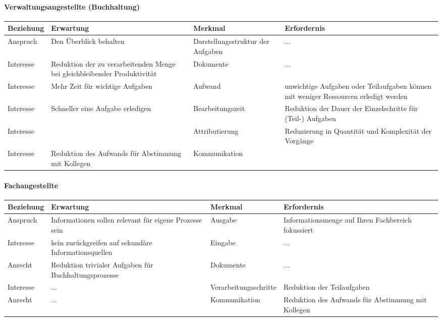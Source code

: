 \documentclass[11pt,oneside,a4paper,notitlepage]{article}
\begin{document}
\paragraph*{Verwaltungsangestellte (Buchhaltung) }
\begin{center}
\begin{tabular}{| p{25mm} | p{5cm} | p{35mm} | p{5cm} |}
\hline
Beziehung & Erwartung & Merkmal & Erfordernis\\
\hline
Anspruch  & Den Überblick behalten & Darstellungsstruktur der Aufgaben & ...\\
Interesse & Reduktion der zu verarbeitenden Menge bei gleichbleibender Produktivität & Dokumente & ... \\
Interesse & Mehr Zeit für wichtige Aufgaben & Aufwand & unwichtige Aufgaben oder Teilaufgaben können mit weniger Ressourcen erledigt werden\\
Interesse & Schneller eine Aufgabe erledigen & Bearbeitungszeit & Reduktion der Dauer der Einzelschritte für (Teil-) Aufgaben\\
Interesse & & Attributierung & Reduzierung in Quantität und Komplexität der Vorgänge\\   
Interesse & Reduktion des Aufwands für Abstimmung mit Kollegen & Kommunikation & \\
\hline
\end{tabular}
\end{center}
%
\paragraph*{Fachangestellte}
\begin{center}
\begin{tabular}{| p{25mm} | p{5cm} | p{35mm} | p{5cm} |}
\hline
Beziehung & Erwartung & Merkmal & Erfordernis\\
\hline
Anspruch & Informationen sollen relevant für eigene Prozesse sein & Ausgabe & Informationsmenge auf Ihren Fachbereich fokussiert\\
Interesse & kein zurückgreifen auf sekundäre Informationsquellen & Eingabe & ...\\
Anrecht & Reduktion trivialer Aufgaben für Buchhaltungsprozesse & Dokumente & ... \\
Interesse & ... & Verarbeitungsschritte & Reduktion der Teilaufgaben\\
Anrecht & ... & Kommunikation & Reduktion des Aufwands für Abstimmung mit Kollegen\\
%
\hline
\end{tabular}
\end{center}
%
%
\end{document}
